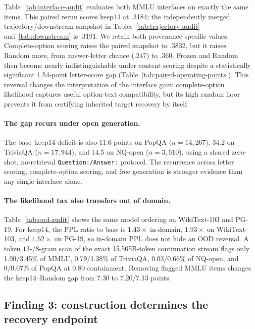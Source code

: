 Table~\ref{tab:interface-audit} evaluates both MMLU interfaces on exactly the
same items. This paired rerun scores keep14 at .3184; the independently merged
trajectory/downstream snapshot in Tables~\ref{tab:trajectory-audit}
and~\ref{tab:downstream} is .3191. We retain both provenance-specific values.
Complete-option scoring raises the paired snapshot to .3832, but it
raises Random more, from answer-letter chance (.247) to .360. Frozen and Random
then become nearly indistinguishable under content scoring despite a
statistically significant 1.54-point letter-score gap
(Table~\ref{tab:paired-operating-points}). This reversal changes the interpretation
of the interface gain: complete-option likelihood captures useful option-text
compatibility, but its high random floor prevents it from certifying inherited
target recovery by itself.

\paragraph{The gap recurs under open generation.}
The base--keep14 deficit is also 11.6 points on PopQA
($n{=}14{,}267$), 34.2 on TriviaQA ($n{=}17{,}944$), and 14.5 on NQ-open
($n{=}3{,}610$), using a shared zero-shot, no-retrieval
\texttt{Question:/Answer:} protocol. The recurrence across letter scoring,
complete-option scoring, and free generation is stronger evidence than any
single interface alone.



\paragraph{The likelihood tax also transfers out of domain.}
Table~\ref{tab:ood-audit} shows the same model ordering on WikiText-103 and
PG-19. For keep14, the PPL ratio to base is $1.43\times$ in-domain,
$1.93\times$ on WikiText-103, and $1.52\times$ on PG-19, so in-domain PPL does
not hide an OOD reversal. A token $13$-/$8$-gram scan of the exact 15.505B-token
continuation stream flags only 1.90/3.45\% of MMLU, 0.79/1.38\% of TriviaQA,
0.03/0.66\% of NQ-open, and 0/0.07\% of PopQA at 0.80 containment. Removing
flagged MMLU items changes the keep14--Random gap from 7.30 to 7.20/7.13 points.

\subsection{Finding 3: construction determines the recovery endpoint}


